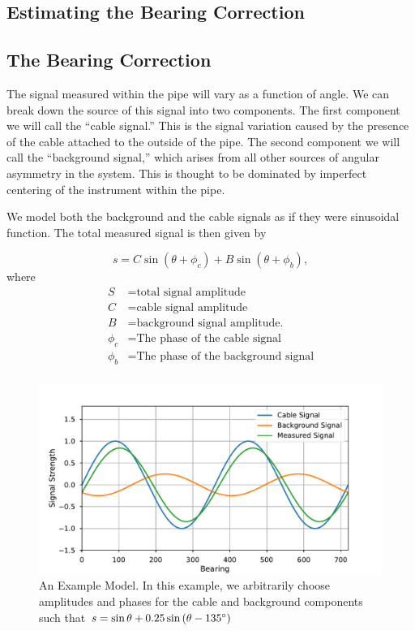 \documentclass[paper=a4, fontsize=11pt]{scrartcl}
\numberwithin{equation}{section}		%
\numberwithin{figure}{section}			%
\numberwithin{table}{section}				%
\begin{document}
\begin{appendices}




\section{Estimating the Bearing Correction}
\subsection{The Bearing Correction}
The signal measured within the pipe will vary as a function of angle.  We can break down the source of this signal into two components.  The first component we will call the ``cable signal.''  This is the signal variation caused by the presence of the cable attached to the outside of the pipe.  The second component we will call the ``background signal,'' which arises from all other sources of angular asymmetry in the system.  This is thought to be dominated by imperfect centering of the instrument within the pipe.

\par We model both the background and the cable signals as if they were sinusoidal function. The total measured signal is then given by

\begin{equation} \label{eq:trig_sig}
    s = C \sin\left(\theta + \phi_c\right) + B \sin\left(\theta + \phi_b\right),
\end{equation}
where
\begin{align*}
        S &= \text{total signal amplitude} \\
        C &= \text{cable signal amplitude} \\
        B &= \text{background signal amplitude.} \\
        \phi_c &= \text{The phase of the cable signal}\\
        \phi_b &= \text{The phase of the background signal}\\
\end{align*}


\begin{figure}[H]
  \caption{An Example Model.  In this example, we arbitrarily choose amplitudes and phases for the cable and background components such that  $s = \sin\theta + 0.25 \sin\left(\theta -135\degree\right)$
  }
  \label{fig:sigs_vs_bearing}
  \centering
  \includegraphics[width=1.0\textwidth]{figures/sigs_vs_bearing.pdf}
\end{figure}


\end{appendices}
\end{document}

